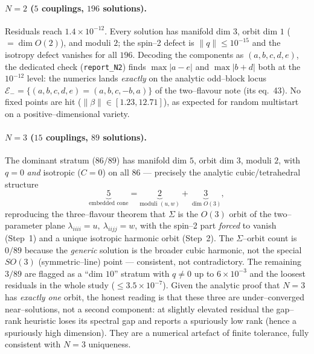 \documentclass[11pt]{article}
\newcommand{\norm}[1]{\lVert #1\rVert}
\newcommand{\code}[1]{\texttt{#1}}
\begin{document}
\paragraph{$N=2$ ($5$ couplings, $196$ solutions).}
Residuals reach $1.4\times10^{-12}$. Every solution has manifold dim $3$,
orbit dim $1$ ($=\dim O(2)$), and moduli $2$; the spin--2 defect is
$\norm q\le10^{-15}$ and the isotropy defect vanishes for all $196$. Decoding
the components as $(a,b,c,d,e)$, the dedicated check (\code{report\_N2}) finds
$\max|a-e|$ and $\max|b+d|$ both at the $10^{-12}$ level: the numerics lands
\emph{exactly} on the analytic odd--block locus
$\mathcal E_-=\{(a,b,c,d,e)=(a,b,c,-b,a)\}$ of the two--flavour note (its
eq.~43). No fixed points are hit ($\norm\beta\in[1.23,12.71]$), as expected for
random multistart on a positive--dimensional variety.

\paragraph{$N=3$ ($15$ couplings, $89$ solutions).}
The dominant stratum ($86/89$) has manifold dim $5$, orbit dim $3$, moduli $2$,
with $q=0$ \emph{and} isotropic ($C=0$) on all $86$ --- precisely the analytic
cubic/tetrahedral structure
\[
\underbrace{5}_{\text{embedded cone}}
=\underbrace{2}_{\text{moduli }(u,w)}+\underbrace{3}_{\dim O(3)},
\]
reproducing the three--flavour theorem that $\Sigma$ is the $O(3)$ orbit of the
two--parameter plane $\lambda_{iiii}=u,\ \lambda_{iijj}=w$, with the spin--2
part \emph{forced} to vanish (Step~1) and a unique isotropic harmonic orbit
(Step~2). The $\Sigma$--orbit count is $0/89$ because the \emph{generic}
solution is the broader cubic harmonic, not the special $SO(3)$ (symmetric--line)
point --- consistent, not contradictory. The remaining $3/89$ are flagged as a
``dim $10$'' stratum with $q\neq0$ up to $6\times10^{-3}$ and the loosest
residuals in the whole study ($\le3.5\times10^{-7}$). Given the analytic proof
that $N=3$ has \emph{exactly one} orbit, the honest reading is that these three
are under--converged near--solutions, not a second component: at slightly
elevated residual the gap--rank heuristic loses its spectral gap and reports a
spuriously low rank (hence a spuriously high dimension). They are a numerical
artefact of finite tolerance, fully consistent with $N=3$ uniqueness.
\end{document}

